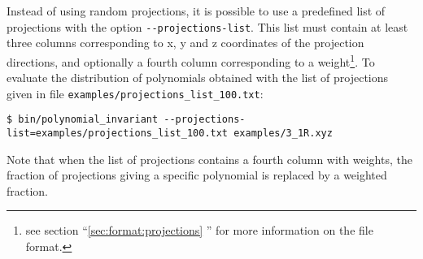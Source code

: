 Instead of using random projections, it is possible to use a predefined list of projections with the option \lstinline{--projections-list}. This list must contain at least three columns corresponding to x, y and z coordinates of the projection directions, and optionally a fourth column corresponding to a weight\footnote{see section ``\ref{sec:format:projections} '' for more information on the file format.}. To evaluate the distribution of polynomials obtained with the list of projections given in file \lstinline{examples/projections_list_100.txt}:
\begin{lstlisting}
$ bin/polynomial_invariant --projections-list=examples/projections_list_100.txt examples/3_1R.xyz
\end{lstlisting}
Note that when the list of projections contains a fourth column with weights, the fraction of projections giving a specific polynomial is replaced by a weighted fraction.


